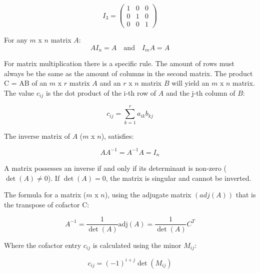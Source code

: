\documentclass[12pt]{article}
\begin{document}
\begin{equation*}
I_{3}=\begin{pmatrix}1&0&0\\ 0&1&0\\ 0&0&1\end{pmatrix} 
\end{equation*}
\vspace{0.1cm}

For any $m$ x $n$ matrix $A$:
\begin{equation}
AI_{n}=A\quad \text{and}\quad I_{m}A=A \tag{14}
\end{equation}
\vspace{0.1cm}

For matrix multiplication there is a specific rule. The amount of rows must always be the same as the amount of columns in the second matrix. The product C = AB of an $m$ x $r$ matrix $A$ and an $r$ x $n$ matrix $B$ will yield an $m$ x $n$ matrix. The value $c_{ij}$ is the dot product of the i-th row of $A$ and the j-th column of $B$:

\begin{equation}
c_{ij}=\sum _{k=1}^{r}a_{ik}b_{kj} \tag{15}
\end{equation}
\vspace{0.1cm}

The inverse matrix of $A$ ($m$ x $n$), satisfies: 

\begin{equation}
AA^{-1}=A^{-1}A=I_{n} \tag{16}
\end{equation}
\vspace{0.1cm}

A matrix possesses an inverse if and only if its determinant is non-zero ($\det(A) \neq 0$). If $\det(A) = 0$, the matrix is singular and cannot be inverted.

The formula for a matrix ($m$ x $n$), using the adjugate matrix $(adj(A))$ that is the transpose of cofactor C:

\begin{equation}
A^{-1}=\frac{1}{\det (A)}\text{adj}(A)=\frac{1}{\det (A)}C^{T} \tag{17}
\end{equation}
\vspace{0.1cm}

Where the cofactor entry $c_{ij}$ is calculated using the minor $M_{ij}$:

\begin{equation}
c_{ij}=(-1)^{i+j}\det (M_{ij}) \tag{18}
\end{equation}
\vspace{0.1cm}
\end{document}
